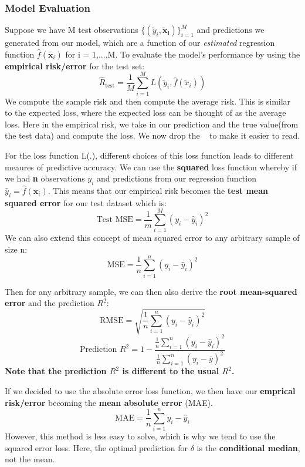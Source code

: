 \documentclass[11pt, oneside]{article}
\theoremstyle{definition}
\begin{document}
\subsubsection{Model Evaluation}
Suppose we have M test observations $\{(\tilde{y}_i, {\bm{\tilde{x}_i}})\}_{i=1}^M$ and predictions we generated from our model, which are a function of our \textit{estimated} regression function $\hat{f}(\tilde{\bm{x}_i})$ for i = 1,...,M. To evaluate the model's performance by using the \textbf{empirical risk/error} for the test set:
$$
\hat{R}_{\text{test}} = \frac{1}{M}\sum\limits_{i=1}^{M}L(\tilde{y}_i,\hat{f}(\tilde{x}_i))
$$
We compute the sample risk and then compute the average risk. This is similar to the expected loss, where the expected loss can be thought of as the average loss. Here in the empirical risk, we take in our prediction and the true value(from the test data) and compute the loss. We now drop the ~ to make it easier to read.

For the loss function L(.), different choices of this loss function leads to different meaures of predictive accuracy. We can use the \textbf{squared} loss function whereby if we had \textbf{n} observations $y_i$ and predictions from our regression function $\hat{y}_i = \hat{f}(\bm{x}_i)$. This means that our empirical risk becomes the \textbf{test mean squared error} for our test dataset which is:
$$
\text{Test MSE} = \frac{1}{m}\sum\limits_{i=1}^{M}(y_i - \hat{y}_i)^2
$$
We can also extend this concept of mean squared error to any arbitrary sample of size n:
$$
\text{MSE} = \frac{1}{n}\sum\limits_{i=1}^{n}(y_i - \hat{y}_i)^2
$$

Then for any arbitrary sample, we can then also derive the \textbf{root mean-squared error} and the prediction $R^2$:
$$
\text{RMSE} = \sqrt{\frac{1}{n}\sum\limits_{i=1}^{n}(y_i - \hat{y}_i)^2}
$$
$$
\text{Prediction }R^2 = 1 - \frac{\frac{1}{n}\sum\limits_{i=1}^{n}(y_i - \hat{y}_i)^2}{\frac{1}{n}\sum\limits_{i=1}^{n}(y_i - \bar{y})^2}
$$
\textbf{Note that the prediction $R^2$ is different to the usual $R^2$.}

\bigskip

If we decided to use the absolute error loss function, we then have our \textbf{emprical risk/error} becoming the \textbf{mean absolute error} (MAE).
$$
\text{MAE} = \frac{1}{n}\sum\limits_{i=1}^{n}{y_i - \hat{y}_i}
$$
However, this method is less easy to solve, which is why we tend to use the squared error loss. Here, the optimal prediction for $\delta$ is the \textbf{conditional median}, not the mean.
\end{document}
